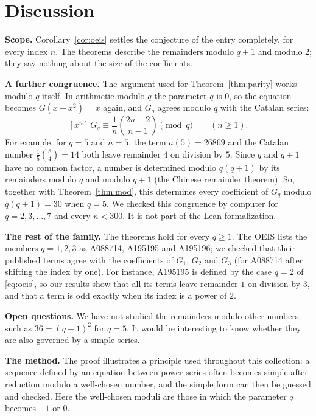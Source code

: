 \documentclass[11pt,a4paper]{article}
\theoremstyle{definition}
\theoremstyle{remark}
\newcommand{\coeff}[2]{[x^{#1}]\,#2}
\newcommand{\para}[1]{\par\medskip\noindent\textbf{#1}\enspace}
\begin{document}
\section{Discussion}\label{sec:discussion}

\para{Scope.} Corollary~\ref{cor:oeis} settles the conjecture of the entry completely,
for every index $n$. The theorems describe the remainders modulo $q+1$ and modulo $2$; they say nothing about the size
of the coefficients.

\para{A further congruence.} The argument used for Theorem~\ref{thm:parity} works modulo $q$ itself. In arithmetic
modulo $q$ the parameter $q$ is $0$, so the equation becomes $G(x-x^2)=x$ again, and $G_q$ agrees modulo $q$ with the
Catalan series:
\[
\coeff{n}{G_q}\equiv\frac{1}{n}\binom{2n-2}{n-1}\pmod q\qquad(n\ge1).
\]
For example, for $q=5$ and $n=5$, the term $a(5)=26869$ and the Catalan number $\frac15\binom84=14$ both leave remainder $4$ on division by $5$. Since $q$ and $q+1$ have no common factor, a number is determined modulo $q(q+1)$ by its
remainders modulo $q$ and modulo $q+1$ (the Chinese remainder theorem). So, together with Theorem~\ref{thm:mod}, this
determines every coefficient of $G_q$ modulo $q(q+1)=30$ when $q=5$. We checked
this congruence by computer for $q=2,3,\dots,7$ and every $n<300$. It is not part of the Lean formalization.

\para{The rest of the family.} The theorems hold for every $q\ge1$. The OEIS lists the members $q=1,2,3$ as A088714,
A195195 and A195196; we checked that their published terms agree with the coefficients of $G_1$, $G_2$ and $G_3$ (for
A088714 after shifting the index by one). For instance, A195195 is defined by the case $q=2$ of
\eqref{eq:oeis}, so our results show that all its terms leave remainder $1$ on division by $3$, and that a term is odd
exactly when its index is a power of $2$.

\para{Open questions.} We have not studied the remainders modulo other numbers, such as $36=(q+1)^2$
for $q=5$. It would be interesting to know whether they are also governed by a simple series.

\para{The method.} The proof illustrates a principle used throughout this collection: a sequence defined by an
equation between power series often becomes simple after reduction modulo a well-chosen number, and the simple form can
then be guessed and checked. Here the well-chosen moduli are those in which the parameter $q$ becomes $-1$ or $0$.
\end{document}
